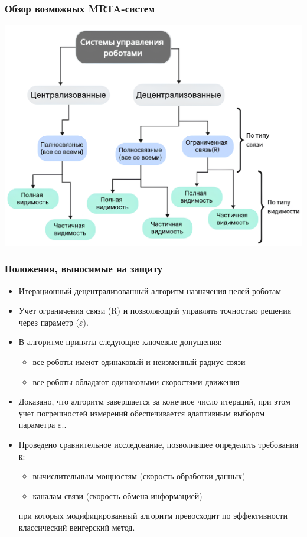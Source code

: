 \documentclass{beamer}
\begin{document}
	\begin{frame}
		\frametitle{Обзор возможных MRTA-систем}
		\centering
		\includegraphics[width=\textwidth,height=0.95\textheight,keepaspectratio]{classification.png}
	\end{frame}


	\begin{frame}
		\frametitle{Положения, выносимые на защиту}
		\begin{itemize}
			\item Итерационный децентрализованный алгоритм назначения целей роботам
			\item Учет ограничения связи (R) и позволяющий управлять точностью решения через параметр (\(\varepsilon\)).
			\item В алгоритме приняты следующие ключевые допущения:
				\begin{itemize}
					\item все роботы имеют одинаковый и неизменный радиус связи
					\item все роботы обладают одинаковыми скоростями движения
				\end{itemize}
			\item Доказано, что алгоритм завершается за конечное число итераций, при этом учет погрешностей измерений обеспечивается адаптивным выбором параметра $\varepsilon$..
			\item Проведено сравнительное исследование, позволившее определить требования к:
			\begin{itemize}
				\item вычислительным мощностям (скорость обработки данных)
				\item каналам связи (скорость обмена информацией)
			\end{itemize}
			при которых модифицированный алгоритм превосходит по эффективности классический венгерский метод.
		\end{itemize}
	\end{frame}
\end{document}
